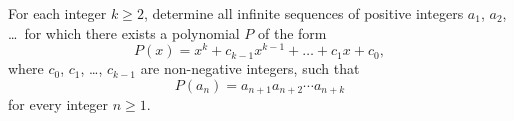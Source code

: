 For each integer $k\geq 2$, determine all infinite sequences of positive integers
$a_1$, $a_2$, \dots\ for which there exists a polynomial $P$ of the form
\[ P(x)=x^k+c_{k-1}x^{k-1}+\dots + c_1 x+c_0, \]
where $c_0$, $c_1$, \dots, $c_{k-1}$ are non-negative integers, such that
\[ P(a_n)=a_{n+1}a_{n+2}\dotsm a_{n+k} \]
for every integer $n\geq 1$.
